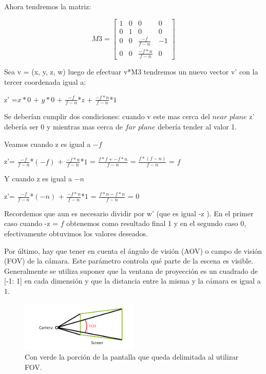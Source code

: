 \documentclass[a4paper]{article}
\begin{document}
Ahora tendremos la matriz:

\[
M3 =
\begin{bmatrix}
1 & 0 & 0 & 0 \\
0 & 1 & 0 & 0 \\
0 & 0 & \frac{-f}{f-n} & -1 \\
0 & 0 & \frac{-f*n}{f-n} & 0  
\end{bmatrix}
\]

Sea v = (x, y, z, w) luego de efectuar v*M3 tendremos un nuevo vector v' con la tercer coordenada igual a: 


z' =$x*0$ $+$ $y*0$ $+$ $\frac{-f}{f-n}$*$z$ + $\frac{-f*n}{f-n}$*$1$

Se deberían cumplir dos condiciones: cuando v este mas cerca del $near$ $plane$ z' debería ser 0 y mientras mas cerca de $far$ $plane$ debería tender al valor 1. 


 Veamos cuando z es igual a $-f$
 
 z'= $\frac{-f}{f-n}$*$(-f)$ + $\frac{-f*n}{f-n}$*$1$ = $\frac{f*f + -f*n}{f-n}$ = $\frac{f*(f-n)}{f-n}$ = $f$
 
 
 Y cuando z es igual a $-n$
 
 
 z'= $\frac{-f}{f-n}$*$(-n)$ + $\frac{-f*n}{f-n}$*$1$ = $\frac{f*n - f*n}{f-n}$ = $0$
 
Recordemos que aun es necesario dividir por w' (que es igual -z ). En el primer caso cuando -z = $f$ obtenemos como resultado final 1 y en el segundo caso 0, efectivamente obtuvimos los valores deseados.


Por último, hay que tener en cuenta el ángulo de visión (AOV)  o campo de visión (FOV) de la cámara. Este parámetro controla qué parte de la escena es visible.\newline
Generalmente se utiliza suponer que la ventana de proyección es un cuadrado de [-1: 1] en cada dimensión y que la distancia entre la misma y la cámara es igual a 1. 


\begin{figure}[h]
    \centering
    \includegraphics[width=0.50\textwidth]{Imagenes/d.png}
    \caption{Con verde la porción de la pantalla que queda delimitada al utilizar FOV.}
    \label{fig:mesh1}
\end{figure}
\end{document}
